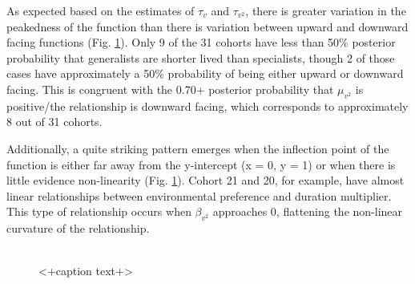 \documentclass[12pt,letterpaper]{article}
\begin{document}
As expected based on the estimates of \(\tau_{v}\) and \(\tau_{v^{2}}\), there is greater variation in the peakedness of the function than there is variation between upward and downward facing functions (Fig. \ref{fig:env_cohort}). Only 9 of the 31 cohorts have less than 50\% posterior probability that generalists are shorter lived than specialists, though 2 of those cases have approximately a 50\% probability of being either upward or downward facing. This is congruent with the 0.70+ posterior probability that \(\mu_{v^{2}}\) is positive/the relationship is downward facing, which corresponds to approximately 8 out of 31 cohorts.

Additionally, a quite striking pattern emerges when the inflection point of the function is either far away from the y-intercept (x = 0, y = 1) or when there is little evidence non-linearity (Fig. \ref{fig:env_cohort}). Cohort 21 and 20, for example, have almost linear relationships between environmental preference and duration multiplier. This type of relationship occurs when \(\beta_{v^{2}}\) approaches 0, flattening the non-linear curvature of the relationship.

\begin{figure}
  \centering
  \includegraphics[height = 0.5\textheight,width=\textwidth,keepaspectratio=true]{figure/cohort_quads}
  \caption{<+caption text+>}
  \label{fig:env_cohort}
\end{figure}
\end{document}
